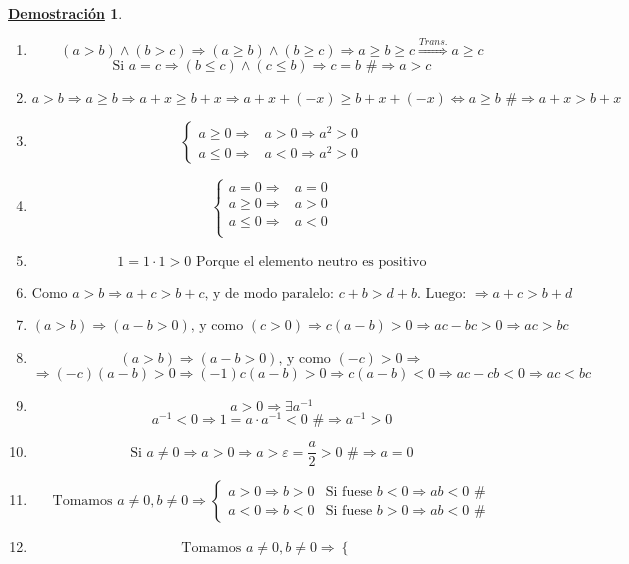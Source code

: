 \documentclass[10pt,a4paper,openright]{book}
\theoremstyle{break}
\newtheorem*{demo}{\underline{Demostración}}
\begin{document}
\begin{demo}
\begin{enumerate}
\item $$(a>b)\wedge (b>c)\Rightarrow (a\geq b)\wedge (b\geq c)\Rightarrow a\geq b \geq c\stackrel{Trans.}{\Rightarrow} a\geq c$$
$$\mbox{Si } a=c\Rightarrow (b\leq c) \wedge (c\leq b)\Rightarrow c=b\mbox{ \#}\Rightarrow a>c$$
\item $$a>b\Rightarrow a\geq b \Rightarrow a+x\geq b+x \Rightarrow a+x+(-x)\geq b+x+(-x)\Leftrightarrow a\geq b \mbox{ \#}\Rightarrow a+x>b+x$$
\item $$\begin{cases}
a\geq 0 \Rightarrow & a>0\Rightarrow a^2>0 \\
a\leq 0 \Rightarrow & a<0 \Rightarrow a^2>0
\end{cases}$$
\item $$\begin{cases}
a=0\Rightarrow & a=0 \\
a\geq 0 \Rightarrow & a>0 \\
a\leq 0 \Rightarrow & a<0 \\
\end{cases}$$
\item $$1=1\cdot 1>0 \mbox{ Porque el elemento neutro es positivo}$$
\item $$\mbox{Como } a>b\Rightarrow a+c>b+c\mbox{, y de modo paralelo: } c+b>d+b\mbox{. Luego: }\Rightarrow a+c>b+d$$
\item $$(a>b)\Rightarrow (a-b>0)\mbox{, y como } (c>0)\Rightarrow c(a-b)>0 \Rightarrow ac-bc>0\Rightarrow ac>bc$$
\item $$(a>b)\Rightarrow (a-b>0)\mbox{, y como }(-c)>0 \Rightarrow $$
$$\Rightarrow (-c)(a-b)>0 \Rightarrow (-1)c(a-b)>0\Rightarrow c(a-b)<0\Rightarrow ac-cb<0\Rightarrow ac<bc$$
\item $$a>0\Rightarrow \exists a^{-1}$$
$$a^{-1}<0\Rightarrow 1=a\cdot a^{-1}<0 \mbox{ \#}\Rightarrow a^{-1}>0$$
\item $$\mbox{Si }a\neq 0\Rightarrow a>0\Rightarrow a>\varepsilon=\frac{a}{2}>0\mbox{ \#}\Rightarrow a=0$$
\item $$\mbox{Tomamos }a\neq 0, b\neq 0\Rightarrow 
\begin{cases}
a>0 \Rightarrow b>0 & \mbox{Si fuese } b<0\Rightarrow ab<0 \mbox{ \#}\\
a<0 \Rightarrow b<0 & \mbox{Si fuese } b>0\Rightarrow ab<0 \mbox{ \#}
\end{cases}
$$
\item $$\mbox{Tomamos }a\neq 0, b\neq 0\Rightarrow 
\begin{cases}

\end{cases}$$
\end{enumerate}
\end{demo}
\end{document}

